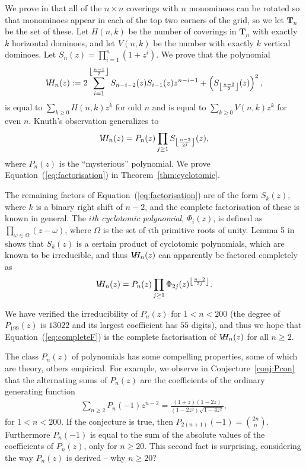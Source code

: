 \documentclass[12pt]{amsart}
\newcommand{\conref}[1]{Conjecture~\ref{conj:#1}}
\newcommand{\eref}[1]{Equation~(\ref{eq:#1})}
\newcommand{\tref}[1]{Theorem~\ref{thm:#1}}
\newcommand\flr[2]{\left\lfloor \frac{#1}{#2} \right\rfloor}
\newcommand{\Tn}[1]{\mathbf T_{#1}}
\newcommand{\vh}{V\hspace{-5pt}H}
\begin{document}
We prove in \cite{EricksonRuskeySchurch2011} that all of the $n\times
n$ coverings with $n$ monominoes can be rotated so that monominoes
appear in each of the top two corners of the grid, so we let $\Tn{n}$
be the set of these.  Let $H(n,k)$ be the number of coverings in
$\Tn{n}$ with exactly $k$ horizontal dominoes, and let $V(n,k)$ be the
number with exactly $k$ vertical dominoes.  Let $S_n(z) =
\prod_{i=1}^n (1+z^i)$.  We prove that the polynomial
\begin{align}
  \label{eq:tnzintro}
  \vh_n(z):=2\sum_{i=1}^{\flr{n-1}{2}}
  S_{n-i-2}(z)S_{i-1}(z)z^{n-i-1} +
  \left(S_{\flr{n-2}{2}}(z)\right)^2,
\end{align}
is equal to $\sum_{k\ge 0} H(n,k)z^k$ for odd $n$ and is equal to
$\sum_{k\ge 0} V(n,k)z^k$ for even $n$.  Knuth's observation
generalizes to
\begin{align}
  \label{eq:factorisation}
  \vh_n(z) = P_n(z) \prod_{j\ge 1} S_{\left\lfloor \frac{n-2}{2^j}
    \right\rfloor}(z),
\end{align}
where $P_n(z)$ is the ``mysterious'' polynomial.  We prove
\eref{factorisation} in \tref{cyclotomic}.




The remaining factors of \eref{factorisation} are of the form
$S_k(z)$, where $k$ is a binary right shift of $n-2$, and the complete
factorisation of these is known in general.  The \emph{$i$th
  cyclotomic polynomial}, $\Phi_i(z)$, is defined as
$\prod_{\omega\in\Omega} (z-\omega)$, where $\Omega$ is the set of
$i$th primitive roots of unity.  Lemma 5 in
\cite{EricksonRuskeySchurch2011} shows that $S_k(z)$ is a certain
product of cyclotomic polynomials, which are known to be irreducible,
and thus $\vh_n(z)$ can apparently be factored completely as
\begin{align}
  \label{eq:completeF}
  \vh_n(z) = P_n(z) \prod_{j\ge 1}  \Phi_{2j} (z)^{\flr{n-2}{2j}}.
\end{align}

We have verified the irreducibility of $P_n(z)$ for ${1< n < 200}$ (the
degree of $P_{199}(z)$ is $13022$ and its largest coefficient has $55$
digits), and thus we hope that \eref{completeF} is the complete
factorisation of $\vh_n(z)$ for all $n\ge 2$.

The class $P_n(z)$ of polynomials has some compelling properties, some
of which are theory, others empirical.  For example, we observe in
\conref{Pcon} that the alternating sums of $P_n(z)$ are the
coefficients of the ordinary generating function
\begin{align*}
  \sum_{n\ge 2} P_n(-1)z^{n-2} =
  \frac{(1+z)(1-2z)}{(1-2z^2)\sqrt{1-4z^2}},
\end{align*}
for ${1 < n < 200}$.  If the conjecture is true, then $P_{2(n+1)}(-1) =
\binom{2n}{n}$. Furthermore $P_n(-1)$ is equal to the sum of the
absolute values of the coefficients of $P_n(z)$, only for $n\ge 20$.
This second fact is surprising, considering the way $P_n(z)$ is
derived -- why $n\ge 20$?
\end{document}

